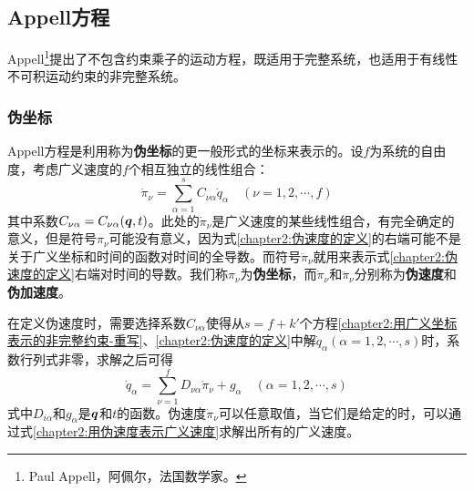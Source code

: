 

\subsection{Appell方程}

Appell\footnote{Paul Appell，阿佩尔，法国数学家。}提出了不包含约束乘子的运动方程，既适用于完整系统，也适用于有线性不可积运动约束的非完整系统。

\subsubsection{伪坐标}

Appell方程是利用称为{\bf 伪坐标}的更一般形式的坐标来表示的。设$f$为系统的自由度，考虑广义速度的$f$个相互独立的线性组合：
\begin{equation}
	\dot{\pi}_\nu = \sum_{\alpha=1}^s C_{\nu\alpha} \dot{q}_\alpha \quad (\nu=1,2,\cdots,f)
	\label{chapter2:伪速度的定义}
\end{equation}
其中系数$C_{\nu\alpha}=C_{\nu\alpha}(\boldsymbol{q},t)$。此处的$\dot{\pi}_\nu$是广义速度的某些线性组合，有完全确定的意义，但是符号$\pi_\nu$可能没有意义，因为式\eqref{chapter2:伪速度的定义}的右端可能不是关于广义坐标和时间的函数对时间的全导数。而符号$\ddot{\pi}_\nu$就用来表示式\eqref{chapter2:伪速度的定义}右端对时间的导数。我们称$\pi_\nu$为{\bf 伪坐标}，而$\dot{\pi}_\nu$和$\ddot{\pi}_\nu$分别称为{\bf 伪速度}和{\bf 伪加速度}。

在定义伪速度时，需要选择系数$C_{\nu\alpha}$使得从$s=f+k'$个方程\eqref{chapter2:用广义坐标表示的非完整约束-重写}、\eqref{chapter2:伪速度的定义}中解$\dot{q}_\alpha(\alpha=1,2,\cdots,s)$时，系数行列式非零，求解之后可得
\begin{equation}
	\dot{q}_\alpha = \sum_{\nu=1}^f D_{\nu\alpha}\dot{\pi}_\nu+g_\alpha\quad (\alpha=1,2,\cdots,s)
	\label{chapter2:用伪速度表示广义速度}
\end{equation}
式中$D_{i\alpha}$和$g_\alpha$是$\boldsymbol{q}$和$t$的函数。伪速度$\dot{\pi}_\nu$可以任意取值，当它们是给定的时，可以通过式\eqref{chapter2:用伪速度表示广义速度}求解出所有的广义速度。

